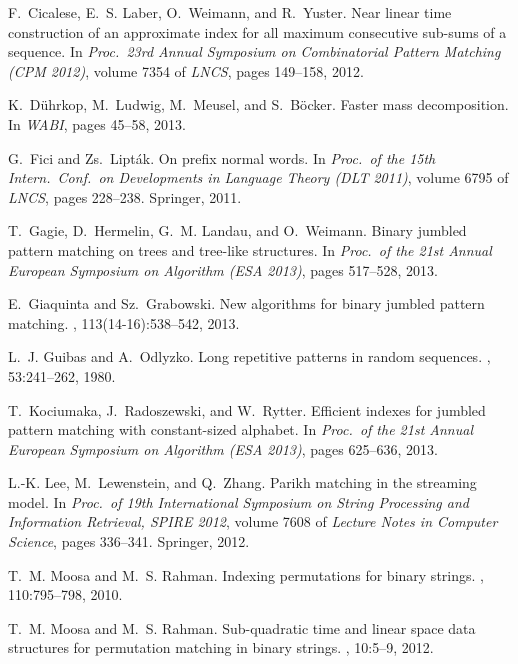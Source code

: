 \documentclass[11pt,a4paper]{llncs}
\begin{document}
\begin{small}
\begin{thebibliography}{10}
F.~Cicalese, E.~S. Laber, O.~Weimann, and R.~Yuster.
\newblock Near linear time construction of an approximate index for all maximum
  consecutive sub-sums of a sequence.
\newblock In {\em Proc.\ 23rd Annual Symposium on Combinatorial Pattern
  Matching (CPM 2012)}, volume 7354 of {\em LNCS}, pages 149--158, 2012.

K.~D{\"u}hrkop, M.~Ludwig, M.~Meusel, and S.~B{\"o}cker.
\newblock Faster mass decomposition.
\newblock In {\em WABI}, pages 45--58, 2013.

G.~Fici and {\relax Zs}.~Lipt{\'a}k.
\newblock On prefix normal words.
\newblock In {\em Proc.\ of the 15th Intern.\ Conf.\ on Developments in
  Language Theory (DLT 2011)}, volume 6795 of {\em LNCS}, pages 228--238.
  Springer, 2011.

T.~Gagie, D.~Hermelin, G.~M. Landau, and O.~Weimann.
\newblock Binary jumbled pattern matching on trees and tree-like structures.
\newblock In {\em Proc.\ of the 21st Annual European Symposium on Algorithm
  (ESA 2013)}, pages 517--528, 2013.

E.~Giaquinta and {\relax Sz}.~Grabowski.
\newblock New algorithms for binary jumbled pattern matching.
, 113(14-16):538--542, 2013.

L.~J. Guibas and A.~Odlyzko.
\newblock Long repetitive patterns in random sequences.
, 53:241--262, 1980.

T.~Kociumaka, J.~Radoszewski, and W.~Rytter.
\newblock Efficient indexes for jumbled pattern matching with constant-sized
  alphabet.
\newblock In {\em Proc.\ of the 21st Annual European Symposium on Algorithm
  (ESA 2013)}, pages 625--636, 2013.

L.-K. Lee, M.~Lewenstein, and Q.~Zhang.
\newblock Parikh matching in the streaming model.
\newblock In {\em Proc.\ of 19th International Symposium on String Processing
  and Information Retrieval, SPIRE 2012}, volume 7608 of {\em Lecture Notes in
  Computer Science}, pages 336--341. Springer, 2012.

T.~M. Moosa and M.~S. Rahman.
\newblock Indexing permutations for binary strings.
, 110:795--798, 2010.

T.~M. Moosa and M.~S. Rahman.
\newblock Sub-quadratic time and linear space data structures for permutation
  matching in binary strings.
, 10:5--9, 2012.


\end{thebibliography}
\end{small}
\end{document}
